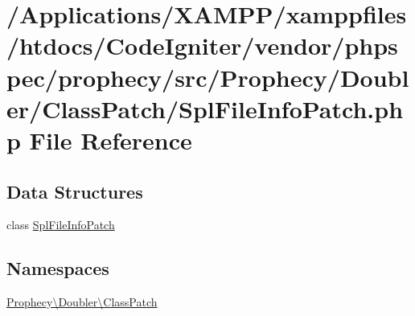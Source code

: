 \hypertarget{_spl_file_info_patch_8php}{}\section{/\+Applications/\+X\+A\+M\+P\+P/xamppfiles/htdocs/\+Code\+Igniter/vendor/phpspec/prophecy/src/\+Prophecy/\+Doubler/\+Class\+Patch/\+Spl\+File\+Info\+Patch.php File Reference}
\label{_spl_file_info_patch_8php}
\subsection*{Data Structures}
\begin{DoxyCompactItemize}
\item 
class \mbox{\hyperlink{class_prophecy_1_1_doubler_1_1_class_patch_1_1_spl_file_info_patch}{Spl\+File\+Info\+Patch}}
\end{DoxyCompactItemize}
\subsection*{Namespaces}
\begin{DoxyCompactItemize}
\item 
 \mbox{\hyperlink{namespace_prophecy_1_1_doubler_1_1_class_patch}{Prophecy\textbackslash{}\+Doubler\textbackslash{}\+Class\+Patch}}
\end{DoxyCompactItemize}
